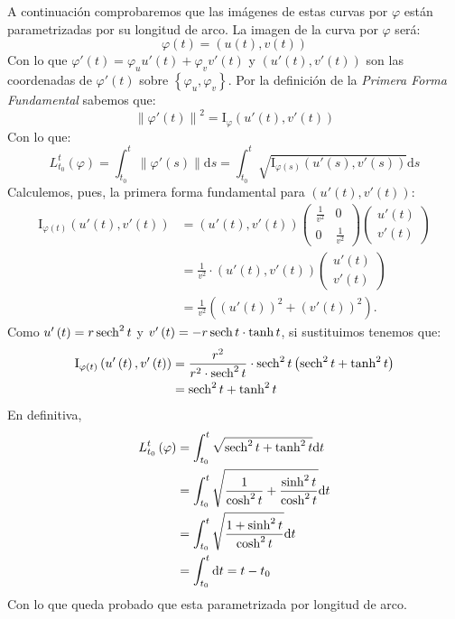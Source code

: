 A continuación comprobaremos que las imágenes de estas curvas por $\varphi$
están parametrizadas por su longitud de arco. La imagen de la curva por
$\varphi$ será:
\[
\varphi\left( t \right) = \left( u\left( t \right), v \left( t \right) \right)
\]
Con lo que $\varphi'\left( t \right) = \varphi_u u'\left( t \right) + \varphi_v
v'\left( t \right)$ y $\left( u'\left( t \right), v'\left( t \right) \right)$
son las coordenadas de $\varphi'\left( t \right)$ sobre $\left\{ \varphi_u,
\varphi_v \right\}$. Por la definición de la \textit{Primera Forma Fundamental}
sabemos que:
\[
\left\lVert \varphi'\left( t \right) \right\rVert^2 = \mathrm{I}_{\varphi}
\left( u'\left( t \right), v'\left( t \right) \right)
\]
Con lo que:
\[
L_{t_0}^t \left( \varphi \right) = \int_{t_0}^{t} \left\lVert \varphi'\left( s
\right) \right\rVert \mathrm{d}s = \int_{t_0}^{t}
\sqrt{\mathrm{I}_{\varphi\left( s \right)} \left( u'\left( s \right), v'\left( s
\right) \right)} \mathrm{d}s
\]
Calculemos, pues, la primera forma fundamental para $\left( u'\left( t \right),
v'\left( t \right) \right)$:
\begin{align*}
\mathrm{I}_{\varphi\left( t \right)}\left( u'\left( t \right), v'\left( t
\right) \right) &= \left( u'\left( t \right), v'\left( t \right) \right)
\begin{pmatrix} \frac{1}{v^2} & 0\\ 0 & \frac{1}{v^2} \end{pmatrix}
\begin{pmatrix} u'\left( t \right)\\ v'\left( t \right) \end{pmatrix}\\ 
&= \frac{1}{v^2} \cdot \left( u'\left( t \right), v'\left( t \right) \right) \begin{pmatrix} u'\left( t \right)\\ v'\left( t \right) \end{pmatrix}\\
&= \frac{1}{v^2} \left( \left( u'\left( t \right) \right)^2 + \left( v'\left( t
\right) \right)^2 \right).
\end{align*}
Como $u'\left( t \right) = r \operatorname{sech}^2 t$ y $v'\left( t \right) = -r \operatorname{sech} t
\cdot \tanh t$, si sustituimos tenemos que:
\begin{align*}
\mathrm{I}_{\varphi\left( t \right)}\left( u'\left( t \right), v'\left( t
\right) \right) &= \frac{r^2}{r^2 \cdot \operatorname{sech}^2 t} \cdot \operatorname{sech}^2 t \left( \operatorname{sech}^2 t + \tanh^2 t
\right)\\
&= \operatorname{sech}^2 t + \tanh^2 t
\end{align*}
En definitiva,
\begin{align*}
L_{t_0}^t \left( \varphi \right) &= \int_{t_0}^{t} \sqrt{\operatorname{sech}^2 t + \tanh^2
t} \mathrm{d}t\\
&= \int_{t_0}^{t} \sqrt{\frac{1}{\cosh^2 t} + \frac{\sinh^2 t}{\cosh^2 t}}
\mathrm{d}t\\
&= \int_{t_0}^{t} \sqrt{\frac{1 + \sinh^2 t}{\cosh^2 t}} \mathrm{d}t\\
&= \int_{t_0}^{t}  \mathrm{d}t= t - t_0
\end{align*}
Con lo que queda probado que esta parametrizada por longitud de arco.

